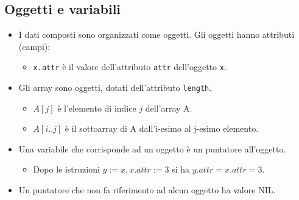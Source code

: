\subsection{Oggetti e variabili}

\begin{itemize}
    \item I dati composti sono organizzati come oggetti. Gli oggetti hanno attributi (campi):
    \begin{itemize}
        \item \texttt{x.attr} è il valore dell'attributo \texttt{attr} dell'oggetto \texttt{x}.
    \end{itemize}
    \item Gli array sono oggetti, dotati dell'attributo \texttt{length}.
    \begin{itemize}
        \item \(A[j]\) è l'elemento di indice \(j\) dell'array A.
        \item \(A[i..j]\) è il sottoarray di A dall'i-esimo al j-esimo elemento.
    \end{itemize}
    \item Una variabile che corrisponde ad un oggetto è un puntatore all'oggetto.
    \begin{itemize}
        \item Dopo le istruzioni \( y := x, x.attr := 3 \) si ha \( y.attr = x.attr = 3 \).
    \end{itemize}
    \item Un puntatore che non fa riferimento ad alcun oggetto ha valore NIL.
\end{itemize}